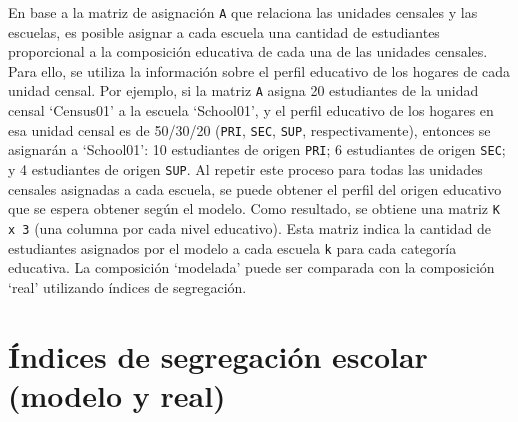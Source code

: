 \documentclass[
  spanish,
  a4paper,%
  chapterprefix=true,%
  DIV=calc,%
  twoside]{scrbook}%
\newcommand{\passthrough}[1]{#1}
\begin{document}
En base a la matriz de asignación \passthrough{\lstinline!A!} que relaciona las unidades censales y las escuelas, es posible asignar a cada escuela una cantidad de estudiantes proporcional a la composición educativa de cada una de las unidades censales. Para ello, se utiliza la información sobre el perfil educativo de los hogares de cada unidad censal. Por ejemplo, si la matriz \passthrough{\lstinline!A!} asigna 20 estudiantes de la unidad censal `Census01' a la escuela `School01', y el perfil educativo de los hogares en esa unidad censal es de 50/30/20 (\passthrough{\lstinline!PRI!}, \passthrough{\lstinline!SEC!}, \passthrough{\lstinline!SUP!}, respectivamente), entonces se asignarán a `School01': 10 estudiantes de origen \passthrough{\lstinline!PRI!}; 6 estudiantes de origen \passthrough{\lstinline!SEC!}; y 4 estudiantes de origen \passthrough{\lstinline!SUP!}. Al repetir este proceso para todas las unidades censales asignadas a cada escuela, se puede obtener el perfil del origen educativo que se espera obtener según el modelo. Como resultado, se obtiene una matriz \passthrough{\lstinline!K x 3!} (una columna por cada nivel educativo). Esta matriz indica la cantidad de estudiantes asignados por el modelo a cada escuela \passthrough{\lstinline!k!} para cada categoría educativa. La composición `modelada' puede ser comparada con la composición `real' utilizando índices de segregación.

\chapter{Índices de segregación escolar (modelo y real)}\label{appendixH}
\end{document}
